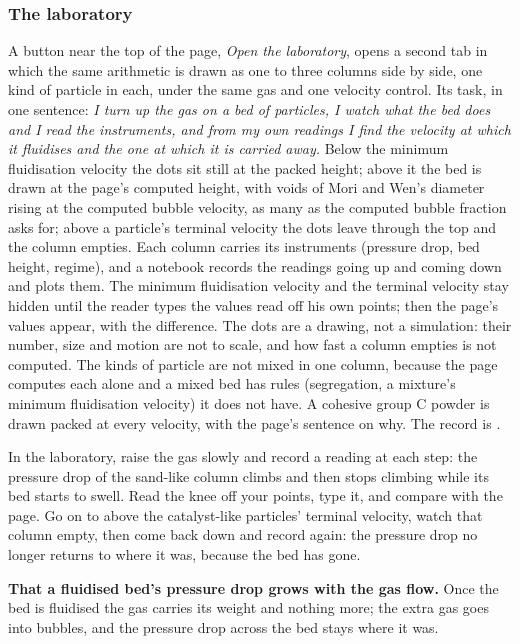 \documentclass[11pt,a4paper]{article}
\begin{document}
\subsubsection*{The laboratory}

A button near the top of the page, \emph{Open the laboratory}, opens a second
tab in which the same arithmetic is drawn as one to three columns side by side,
one kind of particle in each, under the same gas and one velocity control.
Its task, in one sentence: \emph{I turn up the gas on a bed of particles, I
watch what the bed does and I read the instruments, and from my own readings I
find the velocity at which it fluidises and the one at which it is carried
away.}  Below the minimum fluidisation velocity the dots sit still at the
packed height; above it the bed is drawn at the page's computed height, with
voids of Mori and Wen's diameter rising at the computed bubble velocity, as
many as the computed bubble fraction asks for; above a particle's terminal
velocity the dots leave through the top and the column empties.  Each column
carries its instruments (pressure drop, bed height, regime), and a notebook
records the readings going up and coming down and plots them.  The minimum
fluidisation velocity and the terminal velocity stay hidden until the reader
types the values read off his own points; then the page's values appear, with
the difference.  The dots are a drawing, not a simulation: their number, size
and motion are not to scale, and how fast a column empties is not computed.
The kinds of particle are not mixed in one column, because the page computes
each alone and a mixed bed has rules (segregation, a mixture's minimum
fluidisation velocity) it does not have.  A cohesive group C powder is drawn
packed at every velocity, with the page's sentence on why.  The record is
.

\begin{tryit}
In the laboratory, raise the gas slowly and record a reading at each step:
the pressure drop of the sand-like column climbs and then stops climbing
while its bed starts to swell.  Read the knee off your points, type it, and
compare with the page.  Go on to above the catalyst-like particles' terminal
velocity, watch that column empty, then come back down and record again: the
pressure drop no longer returns to where it was, because the bed has gone.
\end{tryit}

\begin{pitfall}
\textbf{That a fluidised bed's pressure drop grows with the gas flow.}  Once
the bed is fluidised the gas carries its weight and nothing more; the extra gas
goes into bubbles, and the pressure drop across the bed stays where it was.
\end{pitfall}
\end{document}
